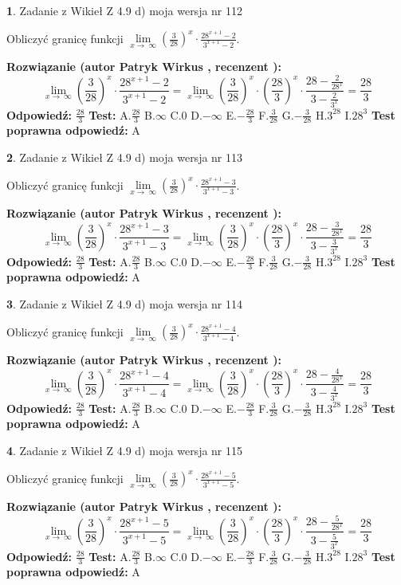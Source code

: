 \documentclass[12pt, a4paper]{article}
\theoremstyle{definition} %
\newtheorem{zad}{}
\newcommand{\zadStart}[1]{\begin{zad}#1\newline}
\newcommand{\zadStop}{\end{zad}}
\newcommand{\rozwStart}[2]{\noindent \textbf{Rozwiązanie (autor #1 , recenzent #2): }\newline}
\newcommand{\rozwStop}{\newline}
\newcommand{\odpStart}{\noindent \textbf{Odpowiedź:}\newline}
\newcommand{\odpStop}{\newline}
\newcommand{\testStart}{\noindent \textbf{Test:}\newline}
\newcommand{\testStop}{\newline}
\newcommand{\kluczStart}{\noindent \textbf{Test poprawna odpowiedź:}\newline}
\newcommand{\kluczStop}{\newline}
\begin{document}
\zadStart{Zadanie z Wikieł Z 4.9 d) moja wersja nr 112}


Obliczyć granicę funkcji  $\lim\limits_{x\to\ \infty}(\frac{3}{28})^{x}\cdot\frac{28^{x+1}-2}{3^{x+1}-2}$.
\zadStop
\rozwStart{Patryk Wirkus}{}
$$\lim\limits_{x\to\ \infty}(\frac{3}{28})^{x}\cdot\frac{28^{x+1}-2}{3^{x+1}-2}=\lim\limits_{x\to\ \infty}(\frac{3}{28})^{x}\cdot(\frac{28}{3})^{x} \cdot \frac{28-\frac{2}{28^{x}}}{3-\frac{2}{3^{x}}} = \frac{28}{3}$$
\rozwStop
\odpStart
$\frac{28}{3}$
\odpStop
\testStart
A.$\frac{28}{3}$ B.$\infty$ C.$0$ D.$-\infty$ E.$-\frac{28}{3}$
F.$\frac{3}{28}$ G.$-\frac{3}{28}$
H.$3^{28}$
I.$28^{3}$
\testStop
\kluczStart
A
\kluczStop



\zadStart{Zadanie z Wikieł Z 4.9 d) moja wersja nr 113}


Obliczyć granicę funkcji  $\lim\limits_{x\to\ \infty}(\frac{3}{28})^{x}\cdot\frac{28^{x+1}-3}{3^{x+1}-3}$.
\zadStop
\rozwStart{Patryk Wirkus}{}
$$\lim\limits_{x\to\ \infty}(\frac{3}{28})^{x}\cdot\frac{28^{x+1}-3}{3^{x+1}-3}=\lim\limits_{x\to\ \infty}(\frac{3}{28})^{x}\cdot(\frac{28}{3})^{x} \cdot \frac{28-\frac{3}{28^{x}}}{3-\frac{3}{3^{x}}} = \frac{28}{3}$$
\rozwStop
\odpStart
$\frac{28}{3}$
\odpStop
\testStart
A.$\frac{28}{3}$ B.$\infty$ C.$0$ D.$-\infty$ E.$-\frac{28}{3}$
F.$\frac{3}{28}$ G.$-\frac{3}{28}$
H.$3^{28}$
I.$28^{3}$
\testStop
\kluczStart
A
\kluczStop



\zadStart{Zadanie z Wikieł Z 4.9 d) moja wersja nr 114}


Obliczyć granicę funkcji  $\lim\limits_{x\to\ \infty}(\frac{3}{28})^{x}\cdot\frac{28^{x+1}-4}{3^{x+1}-4}$.
\zadStop
\rozwStart{Patryk Wirkus}{}
$$\lim\limits_{x\to\ \infty}(\frac{3}{28})^{x}\cdot\frac{28^{x+1}-4}{3^{x+1}-4}=\lim\limits_{x\to\ \infty}(\frac{3}{28})^{x}\cdot(\frac{28}{3})^{x} \cdot \frac{28-\frac{4}{28^{x}}}{3-\frac{4}{3^{x}}} = \frac{28}{3}$$
\rozwStop
\odpStart
$\frac{28}{3}$
\odpStop
\testStart
A.$\frac{28}{3}$ B.$\infty$ C.$0$ D.$-\infty$ E.$-\frac{28}{3}$
F.$\frac{3}{28}$ G.$-\frac{3}{28}$
H.$3^{28}$
I.$28^{3}$
\testStop
\kluczStart
A
\kluczStop



\zadStart{Zadanie z Wikieł Z 4.9 d) moja wersja nr 115}


Obliczyć granicę funkcji  $\lim\limits_{x\to\ \infty}(\frac{3}{28})^{x}\cdot\frac{28^{x+1}-5}{3^{x+1}-5}$.
\zadStop
\rozwStart{Patryk Wirkus}{}
$$\lim\limits_{x\to\ \infty}(\frac{3}{28})^{x}\cdot\frac{28^{x+1}-5}{3^{x+1}-5}=\lim\limits_{x\to\ \infty}(\frac{3}{28})^{x}\cdot(\frac{28}{3})^{x} \cdot \frac{28-\frac{5}{28^{x}}}{3-\frac{5}{3^{x}}} = \frac{28}{3}$$
\rozwStop
\odpStart
$\frac{28}{3}$
\odpStop
\testStart
A.$\frac{28}{3}$ B.$\infty$ C.$0$ D.$-\infty$ E.$-\frac{28}{3}$
F.$\frac{3}{28}$ G.$-\frac{3}{28}$
H.$3^{28}$
I.$28^{3}$
\testStop
\kluczStart
A
\kluczStop
\end{document}
